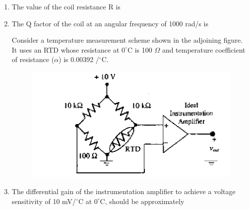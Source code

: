 \documentclass[journal,12pt,onecolumn]{IEEEtran}
\theoremstyle{remark}
\begin{document}
\begin{enumerate}
\item The value of the coil resistance R is
\hfill{}\begin{enumerate}  \end{enumerate}

\item The Q factor of the coil at an angular frequency of 1000 rad/s is
\hfill{}\begin{enumerate}  \end{enumerate}

Consider a temperature measurement scheme shown in the adjoining figure. It uses an RTD whose resistance at $0^\circ$C is 100 $\Omega$ and temperature coefficient of resistance ($\alpha$) is 0.00392 /$^\circ$C.
\begin{figure}[H]
    \centering
    \includegraphics[scale=0.75]{q54}
    \caption*{}
    \label{fig:placeholder}
\end{figure}


\item The differential gain of the instrumentation amplifier to achieve a voltage sensitivity of 10 mV/$^\circ$C at $0^\circ$C, should be approximately
\hfill{}\begin{enumerate}  \end{enumerate}


\end{enumerate}
\end{document}
